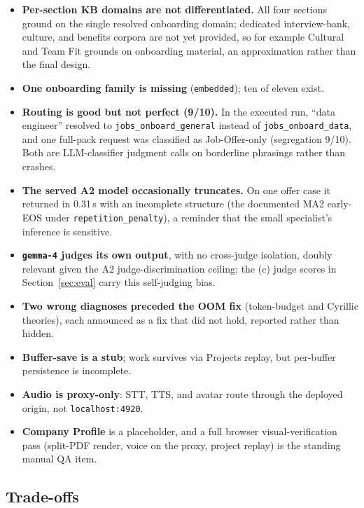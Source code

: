 \begin{itemize}
  \item \textbf{Per-section KB domains are not differentiated.} All four sections ground on
    the single resolved onboarding domain; dedicated interview-bank, culture, and benefits
    corpora are not yet provided, so for example Cultural and Team Fit grounds on onboarding
    material, an approximation rather than the final design.
  \item \textbf{One onboarding family is missing} (\texttt{embedded}); ten of eleven exist.
  \item \textbf{Routing is good but not perfect (9/10).} In the executed run, ``data
    engineer'' resolved to \verb|jobs_onboard_general| instead of \verb|jobs_onboard_data|,
    and one full-pack request was classified as Job-Offer-only (segregation 9/10). Both are
    LLM-classifier judgment calls on borderline phrasings rather than crashes.
  \item \textbf{The served A2 model occasionally truncates.} On one offer case it returned in
    0.31\,s with an incomplete structure (the documented MA2 early-EOS under
    \verb|repetition_penalty|), a reminder that the small specialist's inference is sensitive.
  \item \textbf{\texttt{gemma-4} judges its own output}, with no cross-judge isolation,
    doubly relevant given the A2 judge-discrimination ceiling; the (c) judge scores in
    Section~\ref{sec:eval} carry this self-judging bias.
  \item \textbf{Two wrong diagnoses preceded the OOM fix} (token-budget and Cyrillic
    theories), each announced as a fix that did not hold, reported rather than hidden.
  \item \textbf{Buffer-save is a stub}; work survives via Projects replay, but per-buffer
    persistence is incomplete.
  \item \textbf{Audio is proxy-only}: STT, TTS, and avatar route through the deployed
    origin, not \verb|localhost:4920|.
  \item \textbf{Company Profile} is a placeholder, and a full browser visual-verification
    pass (split-PDF render, voice on the proxy, project replay) is the standing manual QA
    item.
\end{itemize}

\subsection{Trade-offs}
\label{sec:tradeoffs}

